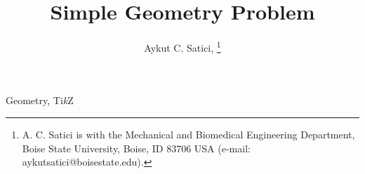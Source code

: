 \documentclass[journal,twoside,web]{ieeecolor}
\begin{document}
\title{Simple Geometry Problem} 
\author{
    Aykut C. Satici, 
    \thanks{A. C. Satici is with the Mechanical and Biomedical Engineering Department, Boise State University, Boise, ID 83706 USA
    (e-mail: aykutsatici@boisestate.edu).}
}
\maketitle

  

\begin{IEEEkeywords}
  Geometry, Ti\textit{k}Z
\end{IEEEkeywords}






        
  

% 
\end{document}
